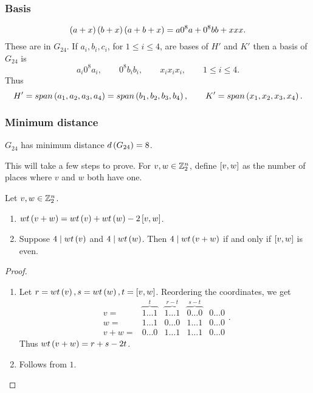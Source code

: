 \subsubsection{Basis}

$$ \br{a + x}\br{b + x}\br{a + b + x} = a0^8a + 0^8bb + xxx. $$
These are in $ G_{24} $. If $ a_i, b_i, c_i $, for $ 1 \le i \le 4 $, are bases of $ H' $ and $ K' $ then a basis of $ G_{24} $ is
$$ a_i0^8a_i, \qquad 0^8b_ib_i, \qquad x_ix_ix_i, \qquad 1 \le i \le 4. $$
Thus
$$ H' = span\br{a_1, a_2, a_3, a_4} = span\br{b_1, b_2, b_3, b_4}, \qquad K' = span\br{x_1, x_2, x_3, x_4}. $$

\subsubsection{Minimum distance}

\begin{theorem}
\label{thm:1.15}
$ G_{24} $ has minimum distance $ d\br{G_{24}} = 8 $.
\end{theorem}

This will take a few steps to prove. For $ v, w \in \mathbb{Z}_2^n $, define $ \sbr{v, w} $ as the number of places where $ v $ and $ w $ both have one.

\begin{proposition}
\label{prop:1.16}
Let $ v, w \in \mathbb{Z}_2^n $.
\begin{enumerate}
\item $ wt\br{v + w} = wt\br{v} + wt\br{w} - 2\sbr{v, w} $.
\item Suppose $ 4 \mid wt\br{v} $ and $ 4 \mid wt\br{w} $. Then $ 4 \mid wt\br{v + w} $ if and only if $ \sbr{v, w} $ is even.
\end{enumerate}
\end{proposition}

\begin{proof}
\hfill
\begin{enumerate}
\item Let $ r = wt\br{v}, s = wt\br{w}, t = \sbr{v, w} $. Reordering the coordinates, we get
$$
\begin{array}{rcccc}
v = & \overbrace{1 \dots 1}^t & \overbrace{1 \dots 1}^{r - t} & \overbrace{0 \dots 0}^{s - t} & 0 \dots 0 \\
w = & 1 \dots 1 & 0 \dots 0 & 1 \dots 1 & 0 \dots 0 \\
v + w = & 0 \dots 0 & 1 \dots 1 & 1 \dots 1 & 0 \dots 0
\end{array}.
$$
Thus $ wt\br{v + w} = r + s - 2t $.
\item Follows from $ 1 $.
\end{enumerate}
\end{proof}

